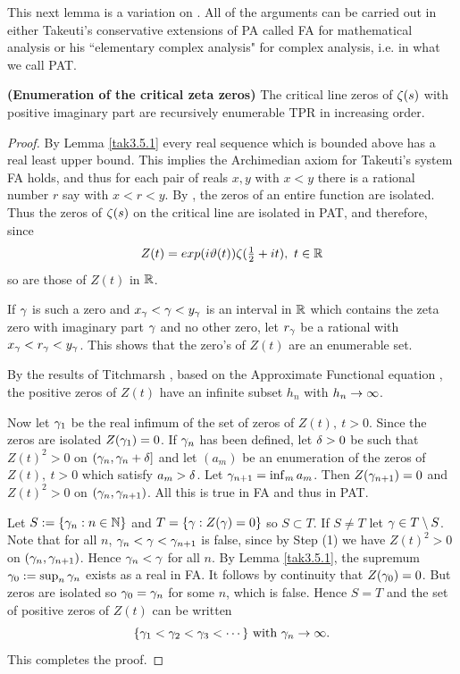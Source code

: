 \documentclass[12pt]{article}
\begin{document}
This next lemma is a variation on \cite[Section 11.10 (3)]{bro}. All of the arguments can be carried out in either Takeuti's  conservative extensions of PA called FA for mathematical analysis or his ``elementary complex analysis" for complex analysis, i.e. in what we call PAT.\par

\begin{lemma}\label{critical-zeros} {\bf (Enumeration of the critical zeta zeros)}
The critical line zeros of $\zeta(s)$ with positive imaginary part are recursively enumerable TPR in increasing order.
\end{lemma}
\begin{proof} 
By Lemma \ref{tak3.5.1} every real sequence which is bounded above has a real least upper bound. This implies the Archimedian axiom for Takeuti's system FA holds, and thus for each pair of reals $x,y$ with $x<y$ there is a rational number $r$ say with $x<r<y$. By \cite[Theorem 4.5.2]{tak}, the zeros of an entire function are isolated. Thus the zeros of $\zeta(s)$ on the critical line are isolated in PAT, and therefore, since 
$$Z(t)=exp(i\vartheta(t))\zeta(\textstyle{\frac{1}{2}}+it),~t\in\mathbb{R}$$
so are those of $Z(t)$ in $\mathbb{R}$. \par

If $\gamma$ is such a zero and $x_\gamma<\gamma<y_\gamma$ is an interval in $\mathbb{R}$ which contains the zeta zero with imaginary part $\gamma$ and no other zero, let $r_\gamma$ be a rational with $x_\gamma<r_\gamma<y_\gamma$. This shows that the zero's of $Z(t)$ are an enumerable set.\par

By the results of Titchmarsh \cite{tit1934}, based on the Approximate Functional equation \cite[Theorem G.2]{bro}, the positive zeros of $Z(t)$ have an infinite subset $h_n$ with $h_n \rightarrow \infty$.\par

Now let $\gamma_1$ be the real infimum of the set of zeros of $Z(t),~t>0$. Since the zeros are isolated $Z(\gamma_1)=0$. If $\gamma_n$ has been defined, let $\delta>0$ be such that $Z(t)^2>0$ on $(\gamma_n,\gamma_n+\delta]$ and let $(a_m)$ be an enumeration of the zeros of $Z(t), ~t>0$ which satisfy $a_m>\delta$. Let $\gamma_{n+1}=\inf_m a_m$. Then $Z(\gamma_{n+1})=0$ and $Z(t)^2>0$ on $(\gamma_n,\gamma_{n+1})$. All this is true in FA and thus in PAT.\par
\bigskip

 Let $S:= \{\gamma_n:n\in\mathbb{N}\}$ and $T=\{\gamma:Z(\gamma)=0\}$ so $S\subset T$. If $S\neq T$ let $\gamma\in T\setminus S$. Note that for all $n$, $\gamma_n<\gamma<\gamma_{n+1}$ is false, since by Step (1) we have $Z(t)^2>0$ on $(\gamma_n,\gamma_{n+1})$. Hence $\gamma_n<\gamma$ for all $n$. By Lemma \ref{tak3.5.1}, the supremum $\gamma_0:= \sup_n \gamma_n$ exists as a real in FA. It follows by continuity that $Z(\gamma_0)=0$. But zeros are isolated so  $\gamma_0=\gamma_n$ for some $n$, which is false. Hence $S=T$ and the set of positive zeros of $Z(t)$ can be written
$$
\{\gamma_1<\gamma_2<\gamma_3<\cdots\}\text{ with }\gamma_n\rightarrow \infty.
$$
This completes the proof.
\end{proof}
\end{document}
